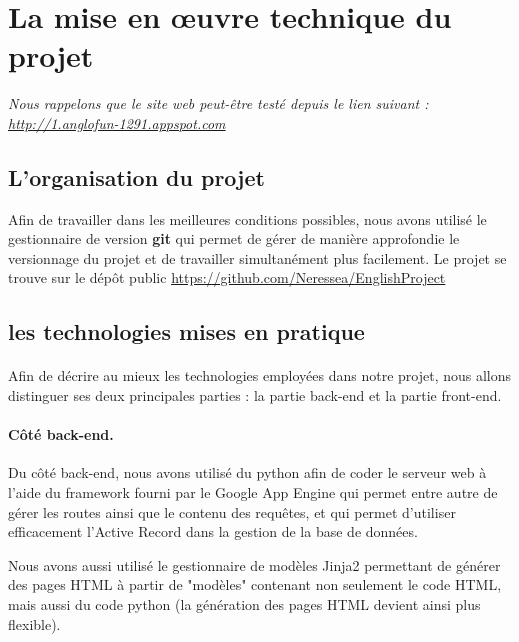 \section{La mise en œuvre technique du projet}

\emph{Nous rappelons que le site web peut-être testé depuis le lien suivant : \url{http://1.anglofun-1291.appspot.com}}

\subsection{L'organisation du projet}

Afin de travailler dans les meilleures conditions possibles, nous avons utilisé le gestionnaire de version \textbf{git} qui permet de gérer de manière approfondie le versionnage du projet et de travailler simultanément plus facilement. Le projet se trouve sur le dépôt public \url{https://github.com/Neressea/EnglishProject}

\subsection{les technologies mises en pratique}

\paragraph{}
Afin de décrire au mieux les technologies employées dans notre projet, nous allons distinguer ses deux principales parties : la partie back-end et la partie front-end.

\paragraph{Côté back-end.}
Du côté back-end, nous avons utilisé du python afin de coder le serveur web à l'aide du framework fourni par le Google App Engine qui permet entre autre de gérer les routes ainsi que le contenu des requêtes, et qui permet d'utiliser efficacement l'Active Record dans la gestion de la base de données. \linebreak

Nous avons aussi utilisé le gestionnaire de modèles Jinja2 permettant de générer des pages HTML à partir de "modèles" contenant non seulement le code HTML, mais aussi du code python (la génération des pages HTML devient ainsi plus flexible). \linebreak

